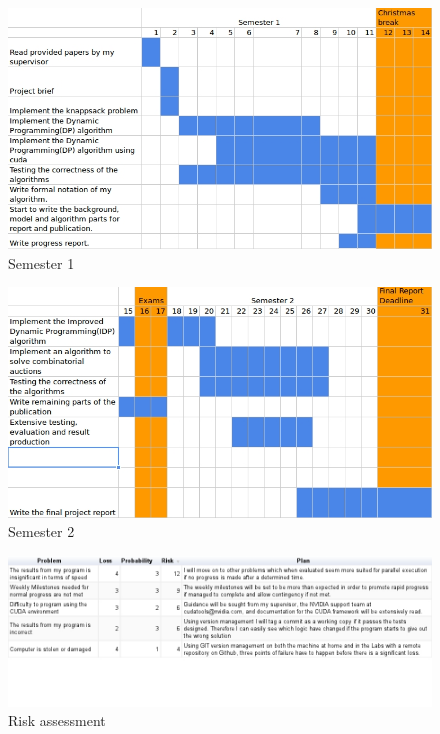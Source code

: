 \documentclass[a4paper, 12pt]{report}
\begin{document}
\newpage
\begin{figure}[htp]
\centering
\includegraphics[width=\linewidth]{sem1.jpg}
\caption{Semester 1}
\end{figure}
\begin{figure}[htp]
\centering
\includegraphics[width=\linewidth]{sem2.jpg}
\caption{Semester 2}
\end{figure}
\begin{figure}[htp]
\centering
\includegraphics[width=\linewidth]{risk.jpg}
\caption{Risk assessment}
\end{figure}
\end{document}

